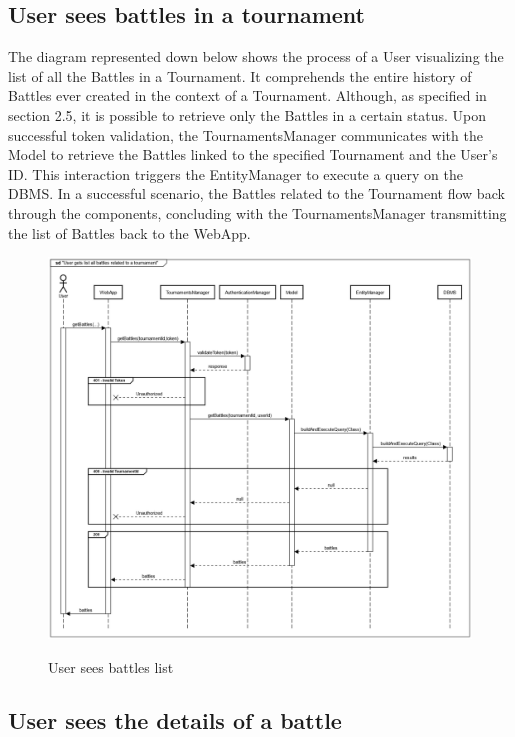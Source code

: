 \documentclass{Configuration_Files/Template}
\begin{document}
\subsection{User sees battles in a tournament}

The diagram represented down below shows the process of a User visualizing the list of all the Battles in a Tournament. It comprehends the entire history of Battles ever created in the context of a Tournament. Although, as specified in section 2.5, it is possible to retrieve only the Battles in a certain status. Upon successful token validation, the TournamentsManager communicates with the Model to retrieve the Battles linked to the specified Tournament and the User's ID. This interaction triggers the EntityManager to execute a query on the DBMS. In a successful scenario, the Battles related to the Tournament flow back through the components, concluding with the TournamentsManager transmitting the list of Battles back to the WebApp. 

\begin{figure}[H]
\centering
\includegraphics[scale = 0.33]{Images/diagrams/sequences/GetBattles.png}\\
\caption{User sees battles list  }
\end{figure}

\subsection{User sees the details of a battle}
\end{document}
